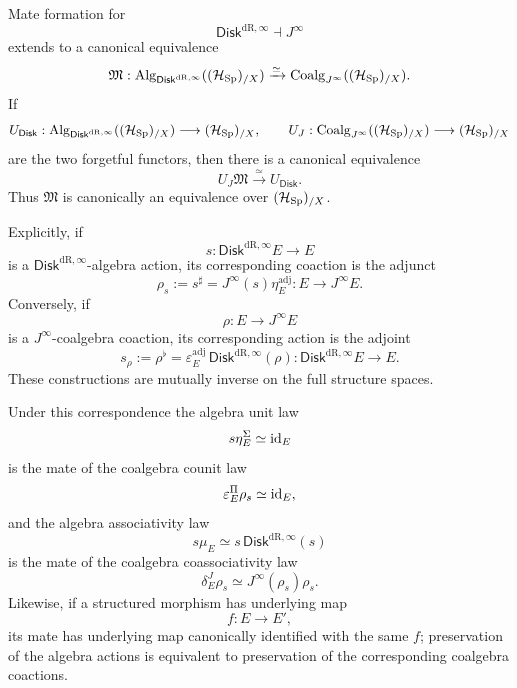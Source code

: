 \begin{theorem}
\label{thm:mate-em-equivalence}
Mate formation for
\[
  \mathsf{Disk}^{\mathrm{dR},\infty}\dashv J^\infty
\]
extends to a canonical equivalence
\[
  \mathfrak M:
  \operatorname{Alg}_{\mathsf{Disk}^{\mathrm{dR},\infty}}((\mathcal H_{\operatorname{Sp}})_{/X})
  \xrightarrow{\simeq}
  \operatorname{Coalg}_{J^\infty}((\mathcal H_{\operatorname{Sp}})_{/X}).
\]
If
\[
  U_{\mathsf{Disk}}:
  \operatorname{Alg}_{\mathsf{Disk}^{\mathrm{dR},\infty}}((\mathcal H_{\operatorname{Sp}})_{/X})
  \longrightarrow
  (\mathcal H_{\operatorname{Sp}})_{/X},
  \qquad
  U_J:
  \operatorname{Coalg}_{J^\infty}((\mathcal H_{\operatorname{Sp}})_{/X})
  \longrightarrow
  (\mathcal H_{\operatorname{Sp}})_{/X}
\]
are the two forgetful functors, then there is a canonical equivalence
\[
  U_J\mathfrak M
  \xrightarrow{\simeq}
  U_{\mathsf{Disk}}.
\]
Thus \(\mathfrak M\) is canonically an equivalence over
\((\mathcal H_{\operatorname{Sp}})_{/X}\).

Explicitly, if
\[
  s:\mathsf{Disk}^{\mathrm{dR},\infty} E\to E
\]
is a \(\mathsf{Disk}^{\mathrm{dR},\infty}\)-algebra action, its corresponding coaction is the adjunct
\[
  \rho_s
  :=
  s^\sharp
  =
  J^\infty(s)\eta^{\mathrm{adj}}_E:
  E\longrightarrow J^\infty E.
\]
Conversely, if
\[
  \rho:E\to J^\infty E
\]
is a \(J^\infty\)-coalgebra coaction, its corresponding action is the adjoint
\[
  s_\rho
  :=
  \rho^\flat
  =
  \varepsilon^{\mathrm{adj}}_E\,\mathsf{Disk}^{\mathrm{dR},\infty}(\rho):
  \mathsf{Disk}^{\mathrm{dR},\infty} E\longrightarrow E.
\]
These constructions are mutually inverse on the full
structure spaces.

Under this correspondence the algebra unit law
\[
  s\eta^\Sigma_E\simeq\operatorname{id}_E
\]
is the mate of the coalgebra counit law
\[
  \varepsilon^\Pi_E\rho_s\simeq\operatorname{id}_E,
\]
and the algebra associativity law
\[
  s\mu_E\simeq s\,\mathsf{Disk}^{\mathrm{dR},\infty}(s)
\]
is the mate of the coalgebra coassociativity law
\[
  \delta^J_E\rho_s
  \simeq
  J^\infty(\rho_s)\rho_s.
\]
Likewise, if a structured morphism has underlying map
\[
  f:E\to E',
\]
its mate has underlying map canonically identified with the same \(f\);
preservation of the algebra actions is equivalent to preservation of the
corresponding coalgebra coactions.
\end{theorem}

